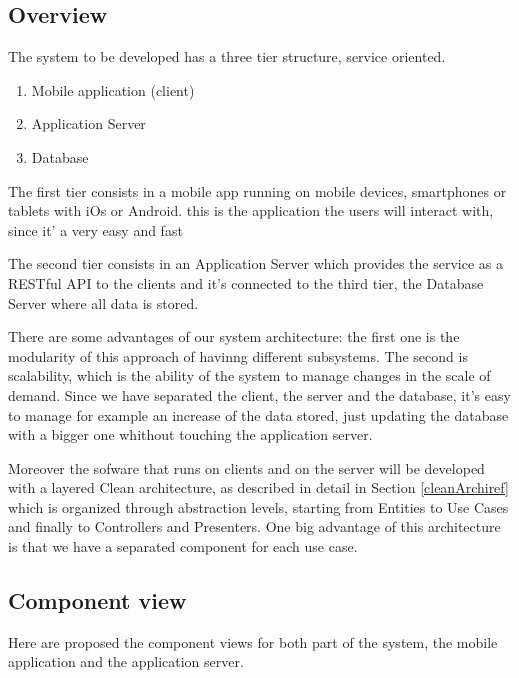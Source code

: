 \subsection{Overview}
The system to be developed has a three tier structure, service oriented.
\begin{enumerate}
  \item Mobile application (client)
  \item Application Server
  \item Database
\end{enumerate}

The first tier consists in a mobile app running on mobile devices, smartphones or tablets with iOs or Android.
this is the application the users will interact with, since it' a very easy and fast

The second tier consists in an Application Server which provides the service as a RESTful API to the clients and it's connected to the third tier, the Database Server where all data is stored.

There are some advantages of our system architecture: the first one is the modularity of this approach of havinng different subsystems. The second is scalability,  which is the ability of the system to manage changes in the scale of demand. Since we have separated the client, the server and the database, it's easy to manage for example an increase of the data stored, just updating the database with a bigger one whithout touching the application server.

Moreover the sofware that runs on clients and on the server will be developed with a layered Clean architecture, as described in detail in Section \ref{cleanArchiref} which is organized through abstraction levels, starting from Entities to Use Cases and finally to Controllers and Presenters.
One big advantage of this architecture is that we have a separated component for each use case. 

\subsection{Component view}
Here are proposed the component views for both part of the system, the mobile application and the application server.

